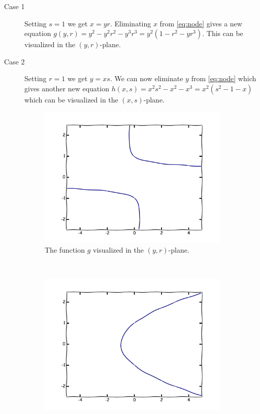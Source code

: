 \documentclass{article}
\begin{document}
\begin{example}
    \begin{description}
        \item[Case 1] Setting $s = 1$ we get $x = yr$. Eliminating $x$ from
            \cref{eq:node} gives a new equation $g(y, r) = y^2 - y^2r^2 -
            y^3r^3 = y^2(1 - r^2 - yr^3)$. This can be visualized in the $(y,
            r)$-plane.
        \item[Case 2] Setting $r = 1$ we get $y = xs$. We can now eliminate $y$
            from \cref{eq:node} which gives another new equation $h(x, s) =
            x^2s^2 - x^2 - x^3 = x^2(s^2 - 1 - x)$ which can be visualized in
            the $(x, s)$-plane.
    \end{description}
    \begin{figure}[h!]
        \centering
        \begin{subfigure}[t]{0.3\textwidth}
            \includegraphics[width=\textwidth]{../pictures/case_1.pdf} 
            \caption{The function $g$ visualized in the $(y, r)$-plane.}
        \end{subfigure}
        ~
        \begin{subfigure}[t]{0.3\textwidth}
            \includegraphics[width=\textwidth]{../pictures/case_2.pdf} 

\end{subfigure}
\end{figure}
\end{example}
\end{document}

